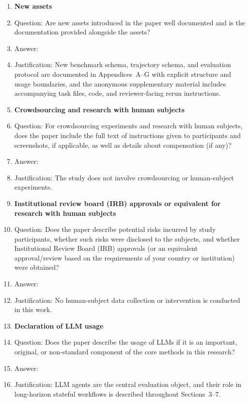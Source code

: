 \begin{enumerate}
\item \textbf{New assets}
\item[] Question: Are new assets introduced in the paper well documented and is the documentation provided alongside the assets?
\item[] Answer: \answerYes{}
\item[] Justification: New benchmark schema, trajectory schema, and evaluation protocol are documented in Appendices~A--G with explicit structure and usage boundaries, and the anonymous supplementary material includes accompanying task files, code, and reviewer-facing rerun instructions.

\item \textbf{Crowdsourcing and research with human subjects}
\item[] Question: For crowdsourcing experiments and research with human subjects, does the paper include the full text of instructions given to participants and screenshots, if applicable, as well as details about compensation (if any)?
\item[] Answer: \answerNA{}
\item[] Justification: The study does not involve crowdsourcing or human-subject experiments.

\item \textbf{Institutional review board (IRB) approvals or equivalent for research with human subjects}
\item[] Question: Does the paper describe potential risks incurred by study participants, whether such risks were disclosed to the subjects, and whether Institutional Review Board (IRB) approvals (or an equivalent approval/review based on the requirements of your country or institution) were obtained?
\item[] Answer: \answerNA{}
\item[] Justification: No human-subject data collection or intervention is conducted in this work.

\item \textbf{Declaration of LLM usage}
\item[] Question: Does the paper describe the usage of LLMs if it is an important, original, or non-standard component of the core methods in this research?
\item[] Answer: \answerYes{}
\item[] Justification: LLM agents are the central evaluation object, and their role in long-horizon stateful workflows is described throughout Sections~3--7.

\end{enumerate}


